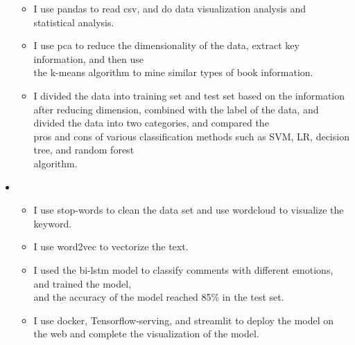 \begin{itemize}[leftmargin=*]
{\begin{itemize}
       \item I use pandas to read csv, and do data visualization analysis and statistical analysis.
       \item I use pca to reduce the dimensionality of the data, extract key information, and then use\\ the k-means algorithm to mine similar types of book information.
       \item I divided the data into training set and test set based on the information after reducing dimension, combined with the label of the data, and divided the data into two categories, and compared the\\ pros and cons of various classification methods such as SVM, LR, decision tree, and random forest\\ algorithm.
      \end{itemize}
      }
    \item
      {\small
      \begin{itemize}
      
       \item I use stop-words to clean the data set and use wordcloud to visualize the keyword. 	
       \item I use word2vec to vectorize the text.
       \item I used the bi-lstm model to classify comments with different emotions, and trained the model, \\and the accuracy of the model reached 85\% in the test set. 
       \item I use docker, Tensorflow-serving, and streamlit to deploy the model on the web and complete the visualization of the model.
      \end{itemize}
      }
     \end{itemize}
















